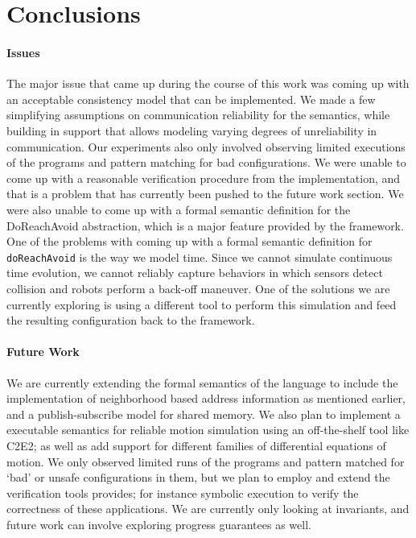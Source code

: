 \section{Conclusions}
\paragraph{Issues}
The major issue that came up during the course of this work was coming up with an acceptable consistency model that can be implemented. We made a few simplifying assumptions on communication reliability for the semantics, while building in support that allows modeling varying degrees of unreliability in communication. Our experiments also only involved observing limited executions of the programs and pattern matching for bad configurations. We were unable to come up with a reasonable verification procedure from the \K implementation, and that is a problem that has currently been pushed to the future work section. 
We were also unable to come up with a formal semantic definition for the DoReachAvoid abstraction, which is a major feature provided by the \StarL framework. One of the problems with coming up with a formal semantic definition for \verb|doReachAvoid| is the way we model time. Since we cannot simulate continuous time evolution, we cannot reliably capture behaviors in which sensors detect collision and robots perform a back-off maneuver. One of the solutions we are currently exploring is using a different tool to perform this simulation and feed the resulting configuration back to the \K framework. 

\paragraph{Future Work}
We are currently extending the formal semantics of the language to include the implementation of neighborhood based address information as mentioned earlier, and a publish-subscribe model for shared memory. We also plan to implement a executable semantics for reliable motion simulation using an off-the-shelf tool like C2E2; as well as add support for different families of differential equations of motion. 
We only observed limited runs of the programs and pattern matched for `bad' or unsafe configurations in them, but we plan to employ and extend the verification tools \K provides; for instance symbolic execution to verify the correctness of these applications. We are currently only looking at invariants, and future work can involve exploring progress guarantees as well. 